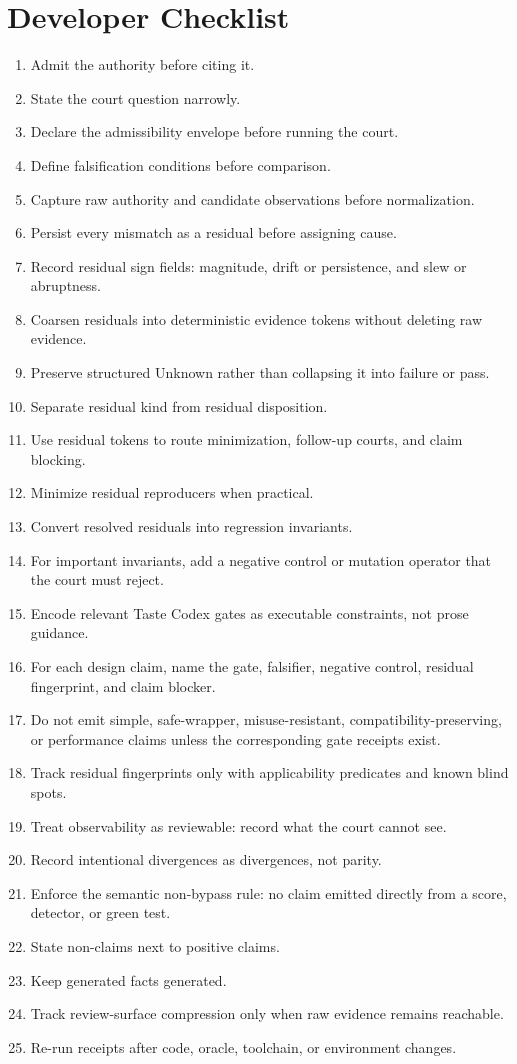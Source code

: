 \documentclass[11pt,a4paper]{article}
\begin{document}
\clearpage
\section{Developer Checklist}
\label{app:checklist}

\begin{enumerate}
\item Admit the authority before citing it.
\item State the court question narrowly.
\item Declare the admissibility envelope before running the court.
\item Define falsification conditions before comparison.
\item Capture raw authority and candidate observations before normalization.
\item Persist every mismatch as a residual before assigning cause.
\item Record residual sign fields: magnitude, drift or persistence, and slew or abruptness.
\item Coarsen residuals into deterministic evidence tokens without deleting raw evidence.
\item Preserve structured Unknown rather than collapsing it into failure or pass.
\item Separate residual kind from residual disposition.
\item Use residual tokens to route minimization, follow-up courts, and claim blocking.
\item Minimize residual reproducers when practical.
\item Convert resolved residuals into regression invariants.
\item For important invariants, add a negative control or mutation operator that the court must reject.
\item Encode relevant Taste Codex gates as executable constraints, not prose guidance.
\item For each design claim, name the gate, falsifier, negative control, residual fingerprint, and claim blocker.
\item Do not emit simple, safe-wrapper, misuse-resistant, compatibility-preserving, or performance claims unless the corresponding gate receipts exist.
\item Track residual fingerprints only with applicability predicates and known blind spots.
\item Treat observability as reviewable: record what the court cannot see.
\item Record intentional divergences as divergences, not parity.
\item Enforce the semantic non-bypass rule: no claim emitted directly from a score, detector, or green test.
\item State non-claims next to positive claims.
\item Keep generated facts generated.
\item Track review-surface compression only when raw evidence remains reachable.
\item Re-run receipts after code, oracle, toolchain, or environment changes.
\end{enumerate}
\end{document}
